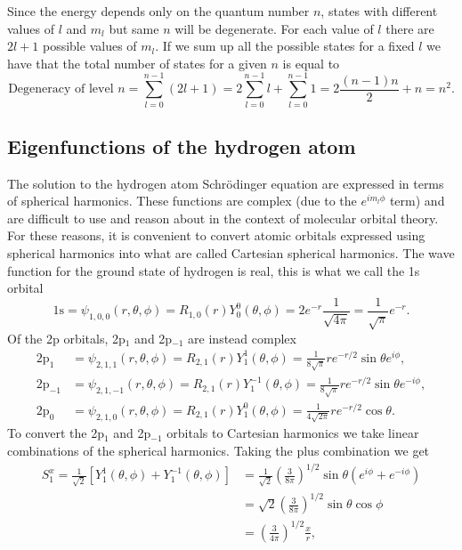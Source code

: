 \documentclass[../Main/chem331-notes.tex]{subfiles}
\begin{document}
Since the energy depends only on the quantum number $n$, states with different values of $l$ and $m_l$ but same $n$ will be degenerate.
For each value of $l$ there are $2l +1$ possible values of $m_l$. If we sum up all the possible states for a fixed $l$ we have that the total number of states for a given $n$ is equal to
\begin{equation}
\text{Degeneracy of level } n = \sum_{l = 0}^{n-1} (2l +1) = 2 \sum_{l = 0}^{n-1} l + \sum_{l = 0}^{n-1} 1
= 2 \frac{(n - 1) n}{2} + n = n^2.
\end{equation}

\subsection{Eigenfunctions of the hydrogen atom}
The solution to the hydrogen atom Schr\"{o}dinger equation are expressed in terms of spherical harmonics. These functions are complex (due to the $e^{i m_l \phi}$ term) and are difficult to use and reason about in the context of molecular orbital theory.
For these reasons, it is convenient to convert atomic orbitals expressed using spherical harmonics into what are called Cartesian spherical harmonics.
The wave function for the ground state of hydrogen is real, this is what we call the 1s orbital
\begin{equation}
\mathrm{1s} = \psi_{1,0,0}(r,\theta,\phi) = R_{1,0}(r) Y_0^0(\theta,\phi) = 2 e^{-r} \frac{1}{\sqrt{4\pi}} = \frac{1}{\sqrt{\pi}} e^{-r}.
\end{equation}
Of the 2p orbitals, 2p$_{1}$ and 2p$_{-1}$ are instead complex
\begin{align}
\mathrm{2p}_{1} &= \psi_{2,1,1}(r,\theta,\phi) = R_{2,1}(r) Y_1^1(\theta,\phi) =
\frac{1}{8\sqrt{\pi}}   r e^{-r/2} \sin \theta e^{i\phi}, \\
\mathrm{2p}_{-1} &= \psi_{2,1,-1}(r,\theta,\phi) = R_{2,1}(r) Y_1^{-1}(\theta,\phi) =
\frac{1}{8\sqrt{\pi}}   r e^{-r/2} \sin \theta e^{-i\phi}, \\
\mathrm{2p}_{0} &= \psi_{2,1,0}(r,\theta,\phi) = R_{2,1}(r) Y_1^{0}(\theta,\phi) =
\frac{1}{4\sqrt{2 \pi}}   r e^{-r/2} \cos \theta.
\end{align}
To convert the 2p$_{1}$ and 2p$_{-1}$ orbitals to Cartesian harmonics we take linear combinations of the spherical harmonics. Taking the plus combination we get
\begin{equation}
\begin{split}
S_1^x = \frac{1}{\sqrt{2}} \left[ Y_1^1(\theta,\phi) + Y_1^{-1}(\theta,\phi) \right]
& = \frac{1}{\sqrt{2}} \left( \frac{3}{8\pi} \right)^{1/2} \sin \theta \left( e^{i\phi} + e^{-i\phi} \right) \\
& = \sqrt{2} \left( \frac{3}{8\pi} \right)^{1/2} \sin \theta \cos \phi \\
& = \left( \frac{3}{4\pi} \right)^{1/2} \frac{x}{r},
\end{split}
\end{equation}
\end{document}
